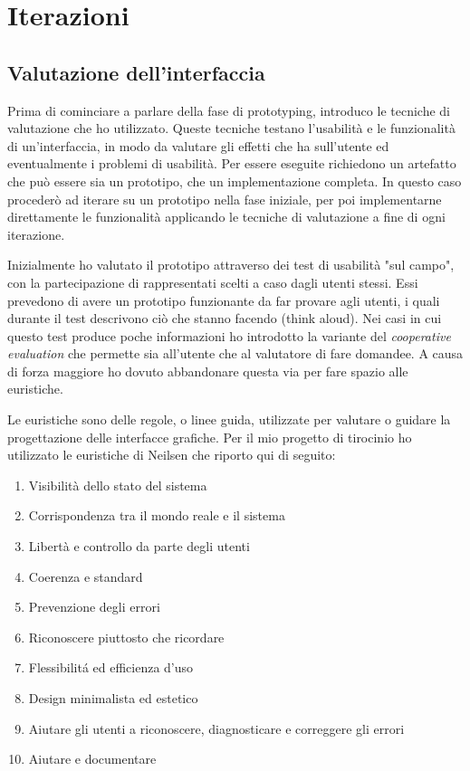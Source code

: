 \documentclass[Lau, oneside, noexaminfo]{sapthesis}%
\begin{document}
\section{Iterazioni}
\subsection{Valutazione dell'interfaccia}
\label{heuristics}
Prima di cominciare a parlare della fase di prototyping, introduco le tecniche di valutazione che ho utilizzato. Queste tecniche testano l'usabilità e le funzionalità di un'interfaccia, in modo da valutare gli effetti che ha sull'utente ed eventualmente i problemi di usabilità. Per essere eseguite richiedono un artefatto che può essere sia un prototipo, che un implementazione completa. In questo caso procederò ad iterare su un prototipo nella fase iniziale, per poi implementarne direttamente le funzionalità applicando le tecniche di valutazione a fine di ogni iterazione.

Inizialmente ho valutato il prototipo attraverso dei test di usabilità "sul campo", con la partecipazione di rappresentati scelti a caso dagli utenti stessi. Essi prevedono di avere un prototipo funzionante da far provare agli utenti, i quali durante il test descrivono ciò che stanno facendo (think aloud). Nei casi in cui questo test produce poche informazioni ho introdotto la variante del \textit{cooperative evaluation} che permette sia all'utente che al valutatore di fare domandee. A causa di forza maggiore ho dovuto abbandonare questa via per fare spazio alle euristiche.

Le euristiche sono delle regole, o linee guida, utilizzate per valutare o guidare la progettazione delle interfacce grafiche. Per il mio progetto di tirocinio ho utilizzato le euristiche di Neilsen \cite{ref:nielsen} che riporto qui di seguito:
\begin{enumerate}
	\item Visibilità dello stato del sistema
	\item Corrispondenza tra il mondo reale e il sistema
	\item Libertà e controllo da parte degli utenti
	\item Coerenza e standard
	\item Prevenzione degli errori
	\item Riconoscere piuttosto che ricordare
	\item Flessibilit\'a ed efficienza d'uso 
	\item Design minimalista ed estetico
	\item Aiutare gli utenti a riconoscere, diagnosticare e correggere gli errori
	\item Aiutare e documentare
\end{enumerate}
\end{document}
